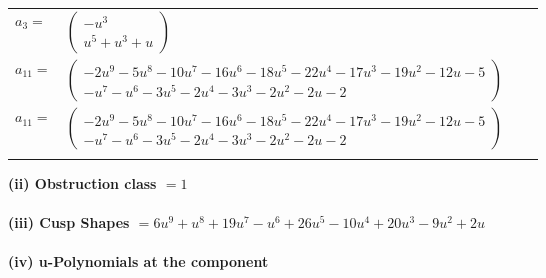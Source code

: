 \documentclass[1p]{elsarticle_modified}
\theoremstyle{definition}
\begin{document}
\begin{tabular}{m{7pt} m{180pt} m{7pt} m{180pt} }
\flushright $a_{3}=$&$\begin{pmatrix}- u^3\\u^5+u^3+u\end{pmatrix}$ \\
\flushright $a_{11}=$&$\begin{pmatrix}-2 u^9-5 u^8-10 u^7-16 u^6-18 u^5-22 u^4-17 u^3-19 u^2-12 u-5\\- u^7- u^6-3 u^5-2 u^4-3 u^3-2 u^2-2 u-2\end{pmatrix}$\\ \flushright $a_{11}=$&$\begin{pmatrix}-2 u^9-5 u^8-10 u^7-16 u^6-18 u^5-22 u^4-17 u^3-19 u^2-12 u-5\\- u^7- u^6-3 u^5-2 u^4-3 u^3-2 u^2-2 u-2\end{pmatrix}$\\&\end{tabular}
\flushleft \textbf{(ii) Obstruction class $= 1$}\\~\\
\flushleft \textbf{(iii) Cusp Shapes $= 6 u^9+u^8+19 u^7- u^6+26 u^5-10 u^4+20 u^3-9 u^2+2 u$}\\~\\
\newpage\renewcommand{\arraystretch}{1}
\flushleft \textbf{(iv) u-Polynomials at the component}\newline \\
\end{document}
